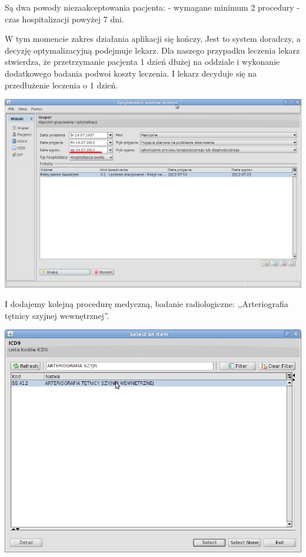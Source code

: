 Są dwa powody niezaakceptowania pacjenta:
- wymagane minimum 2 procedury
- czas hospitalizacji powyżej 7 dni.

W tym momencie zakres działania aplikacji się kończy, Jest to system doradczy, a decyzję optymalizacyjną podejmuje lekarz. Dla naszego przypadku leczenia lekarz stwierdza, że przetrzymanie pacjenta 1 dzień dłużej na oddziale i wykonanie dodatkowego badania podwoi koszty leczenia. I lekarz decyduje się na przedłużenie leczenia o 1 dzień.

\includegraphics[scale=0.4]{images/gruper12}

I dodajemy kolejną procedurę medyczną, badanie radiologiczne: ,,Arteriografia tętnicy szyjnej wewnętrznej''.

\includegraphics[scale=0.4]{images/gruper13}

